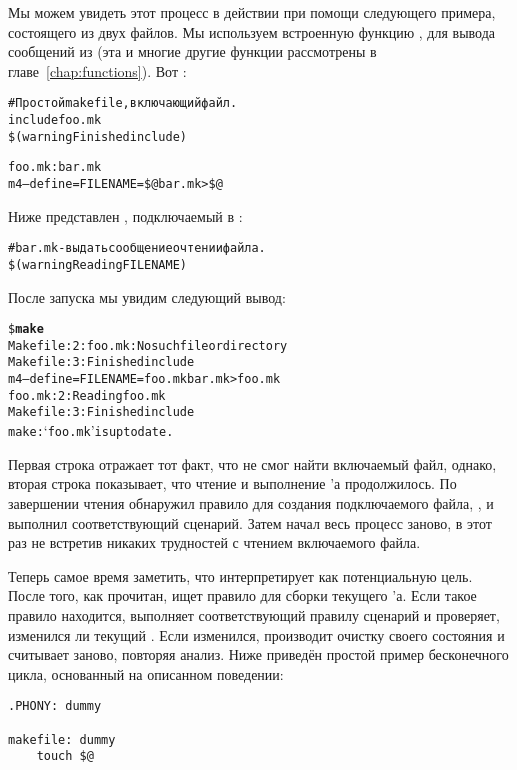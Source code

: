 Мы можем увидеть этот процесс в действии при помощи следующего
примера, состоящего из двух файлов. Мы используем встроенную функцию
, для вывода сообщений из \GNUmake{} (эта и многие
другие функции рассмотрены в главе~\ref{chap:functions}). Вот
\Makefile{}:

{\footnotesize
\begin{alltt}
# Простой makefile, включающий файл.
include foo.mk
\$(warning Finished include)

foo.mk: bar.mk
    m4 --define=FILENAME=\${}@ bar.mk > \${}@
\end{alltt}
}

Ниже представлен , подключаемый в \Makefile{}:

{\footnotesize
\begin{alltt}
# bar.mk - выдать сообщение о чтении файла.
\$(warning Reading FILENAME)
\end{alltt}
}

После запуска \GNUmake{} мы увидим следующий вывод:

{\footnotesize
\begin{alltt}
\$ \textbf{make}
Makefile:2: foo.mk: No such file or directory
Makefile:3: Finished include
m4 --define=FILENAME=foo.mk bar.mk > foo.mk
foo.mk:2: Reading foo.mk
Makefile:3: Finished include
make: `foo.mk' is up to date.
\end{alltt}
}

Первая строка отражает тот факт, что \GNUmake{} не смог найти
включаемый файл, однако, вторая строка показывает, что чтение и
выполнение \Makefile{}'а продолжилось. По завершении чтения \GNUmake{}
обнаружил правило для  создания подключаемого файла,
, и выполнил соответствующий сценарий. Затем
\GNUmake{} начал весь процесс заново, в этот раз не встретив никаких
трудностей с чтением включаемого файла.

Теперь самое время заметить, что \GNUmake{} интерпретирует \Makefile{}
как потенциальную цель. После того, как \Makefile{} прочитан,
\GNUmake{} ищет правило для сборки текущего \Makefile{}'а.  Если такое
правило находится, \GNUmake{} выполняет соответствующий правилу
сценарий и проверяет, изменился ли текущий \Makefile{}. Если
\Makefile{} изменился, \GNUmake{} производит очистку своего состояния
и считывает \Makefile{} заново, повторяя анализ. Ниже приведён простой
пример бесконечного цикла, основанный на описанном поведении:

{\footnotesize
\begin{verbatim}
.PHONY: dummy

makefile: dummy
    touch $@
\end{verbatim}
}

